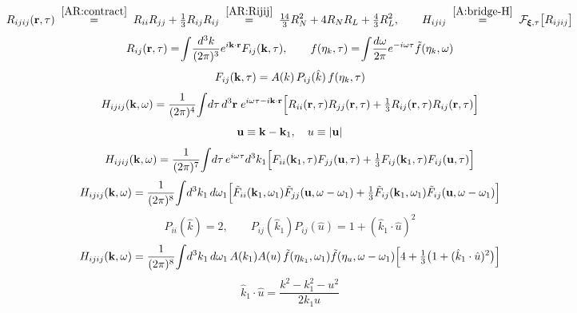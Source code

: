 \documentclass[10pt,prd,aps,nobibnotes,superscriptaddress,preprintnumbers,notitlepage]{revtex4-1}
\newcommand{\khat}{\hat{k}}
\newcommand{\br}{{\bf r}}
\newcommand{\kb}{{\bf k}}
\newcommand{\bxi}{{\boldsymbol{\xi}}}
\newcommand{\ub}{{\bf u}}
\newcommand{\tf}{\tilde{f}}
\begin{document}
\begin{equation}
  R_{ijij}(\br,\tau)
  \;\overset{\eqref{AR:contract}}{=}\;R_{ii}R_{jj}+\tfrac13R_{ij}R_{ij}
  \;\overset{\eqref{AR:Rijij}}{=}\;\tfrac{14}{3}R_N^2+4R_NR_L+\tfrac43R_L^2,
  \qquad
  H_{ijij}\;\overset{\eqref{A:bridge-H}}{=}\;\mathcal{F}_{\bxi,\tau}\bigl[R_{ijij}\bigr]
  \label{A:link}
\end{equation}
\begin{equation}
  R_{ij}(\br,\tau)=\!\int\!\frac{d^3k}{(2\pi)^3}e^{i\kb\cdot\br}F_{ij}(\kb,\tau),
  \qquad
  f(\eta_k,\tau)=\!\int\!\frac{d\omega}{2\pi}e^{-i\omega\tau}\tf(\eta_k,\omega)
  \label{A:pairs}
\end{equation}
\begin{equation}
  F_{ij}(\kb,\tau)=A(k)\,P_{ij}(\khat)\,f(\eta_k,\tau)
  \label{A:Fij}
\end{equation}
\begin{equation}
  H_{ijij}(\kb,\omega)=\frac{1}{(2\pi)^4}\!\int\!d\tau\,d^3\br\;e^{i\omega\tau-i\kb\cdot\br}
  \Bigl[R_{ii}(\br,\tau)R_{jj}(\br,\tau)+\tfrac13R_{ij}(\br,\tau)R_{ij}(\br,\tau)\Bigr]
  \label{A:main}
\end{equation}
\begin{equation}
  \ub\equiv\kb-\kb_1,\quad u\equiv|\ub|
  \label{A:udef}
\end{equation}
\begin{equation}
  H_{ijij}(\kb,\omega)=\frac{1}{(2\pi)^7}\!\int\!d\tau\,e^{i\omega\tau}d^3k_1
  \Bigl[F_{ii}(\kb_1,\tau)F_{jj}(\ub,\tau)+\tfrac13F_{ij}(\kb_1,\tau)F_{ij}(\ub,\tau)\Bigr]
  \label{A:afterr}
\end{equation}
\begin{equation}
  H_{ijij}(\kb,\omega)=\frac{1}{(2\pi)^8}\!\int\!d^3k_1\,d\omega_1
  \Bigl[\tilde F_{ii}(\kb_1,\omega_1)\tilde F_{jj}(\ub,\omega-\omega_1)
  +\tfrac13\tilde F_{ij}(\kb_1,\omega_1)\tilde F_{ij}(\ub,\omega-\omega_1)\Bigr]
  \label{A:conv}
\end{equation}
\begin{equation}
  P_{ii}(\khat)=2,
  \qquad
  P_{ij}(\khat_1)P_{ij}(\hat u)=1+(\khat_1\cdot\hat u)^2
  \label{A:contract}
\end{equation}
\begin{equation}
  H_{ijij}(\kb,\omega)=\frac{1}{(2\pi)^8}\!\int\!d^3k_1\,d\omega_1\,
  A(k_1)A(u)\,\tf(\eta_{k_1},\omega_1)\tf(\eta_u,\omega-\omega_1)
  \Bigl[4+\tfrac13\bigl(1+(\khat_1\cdot\hat u)^2\bigr)\Bigr]
  \label{A:withP}
\end{equation}
\begin{equation}
  \khat_1\cdot\hat u=\frac{k^2-k_1^2-u^2}{2k_1u}
  \label{A:coslaw}
\end{equation}
\end{document}
